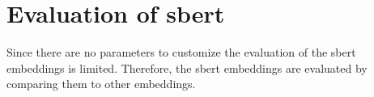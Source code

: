 \section{Evaluation of \ac{sbert}}\label{sec:evaluation-sbert}

Since there are no parameters to customize the evaluation of the \ac{sbert} embeddings is limited.
Therefore, the \ac{sbert} embeddings are evaluated by comparing them to other embeddings.